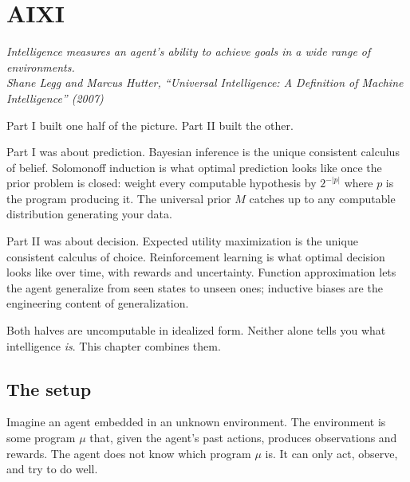 \chapter{AIXI}

\vspace{1em}
\hfill
\begin{minipage}[c]{0.55\textwidth}
\raggedleft
\small\itshape
Intelligence measures an agent's ability to achieve goals in a wide range of environments.\\[0.5em]
\upshape\footnotesize Shane Legg and Marcus Hutter, ``Universal Intelligence: A Definition of Machine Intelligence'' (2007)
\end{minipage}%
\hspace{0.5em}
\begin{minipage}[c]{0.12\textwidth}
\end{minipage}
\vspace{1.5em}

\noindent Part I built one half of the picture. Part II built the other.

Part I was about prediction. Bayesian inference is the unique consistent calculus of belief. Solomonoff induction is what optimal prediction looks like once the prior problem is closed: weight every computable hypothesis by $2^{-|p|}$ where $p$ is the program producing it. The universal prior $M$ catches up to any computable distribution generating your data.

Part II was about decision. Expected utility maximization is the unique consistent calculus of choice. Reinforcement learning is what optimal decision looks like over time, with rewards and uncertainty. Function approximation lets the agent generalize from seen states to unseen ones; inductive biases are the engineering content of generalization.

Both halves are uncomputable in idealized form. Neither alone tells you what intelligence \emph{is}. This chapter combines them.

\section*{The setup}

Imagine an agent embedded in an unknown environment. The environment is some program $\mu$ that, given the agent's past actions, produces observations and rewards. The agent does not know which program $\mu$ is. It can only act, observe, and try to do well.

